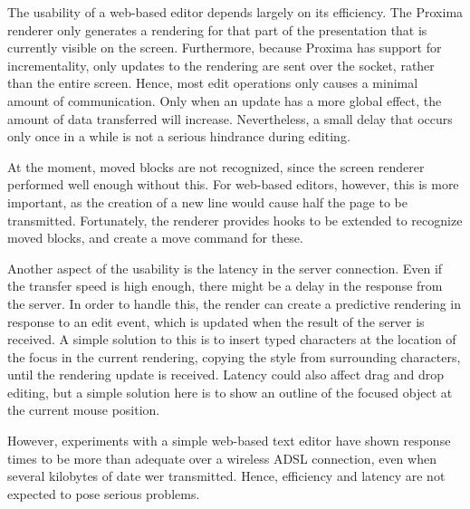 \documentclass[10pt]{article}
\begin{document}
The usability of a web-based editor depends largely on its efficiency. The Proxima renderer only generates a rendering for that part of the presentation that is currently visible on the screen. Furthermore, because Proxima has support for incrementality, only updates to the rendering are sent over the socket, rather than the entire screen. Hence, most edit operations only causes a minimal amount of communication. Only when an update has a more global effect, the amount of data transferred will increase. Nevertheless, a small delay that occurs only once in a while is not a serious hindrance during editing. 

\bc
At the moment, moved blocks are not recognized, since the screen renderer performed well enough without this. For web-based editors, however, this is more important, as the creation of a new line would cause half the page to be transmitted. Fortunately, the renderer provides hooks to be extended to recognize moved blocks, and create a move command for these.
\ec

Another aspect of the usability is the latency in the server connection. Even if the transfer speed is high enough, there might be a delay in the response from the server. \bc In order to handle this, the render can create a predictive rendering in response to an edit event, which is updated when the result of the server is received. \ec A simple solution to this is to insert typed characters at the location of the focus in the current rendering, copying the style from surrounding characters, until the rendering update is received. Latency could also affect drag and drop editing, but a simple solution here is to show an outline of the focused object at the current mouse position. 

However, experiments with a simple web-based text editor have shown response times to be more than adequate over a wireless ADSL connection, even when several kilobytes of date wer transmitted. Hence, efficiency and latency are not expected to pose serious problems. 
\end{document}
